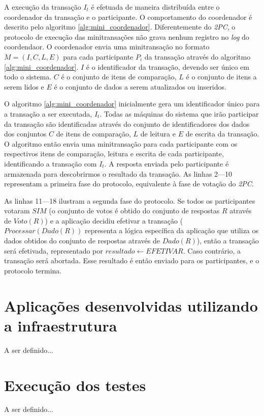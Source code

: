 \documentclass[11pt,twoside,a4paper]{book}
\begin{document}
A execução da transação \(I_t\) é efetuada de maneira distribuída entre o coordenador da transação e o participante. O comportamento do coordenador é descrito pelo algoritmo \ref{alg:mini_coordenador}. Diferentemente do \emph{2PC}, o protocolo de execução das minitransações não grava nenhum registro no \emph{log} do coordendaor. O coordenador envia uma minitransação no formato \(M = (I, C, L, E)\) para cada participante \(P_i\) da transação através do algoritmo \ref{alg:mini_coordenador}. $I$ é o identificador da transação, devendo ser único em todo o sistema. $C$ é o conjunto de itens de comparação, $L$ é o conjunto de itens a serem lidos e $E$ é o conjunto de dados a serem atualizados ou inseridos.

O algoritmo \ref{alg:mini_coordenador} inicialmente gera um identificador único para a transação a ser executada, $I_t$. Todas as máquinas do sistema que irão participar da transação são identificadas através do conjunto de identificadores dos dados dos conjuntos $C$ de itens de comparação, $L$ de leitura e $E$ de escrita da transação. O algoritmo então envia uma minitransação para cada participante com os respectivos itens de comparação, leitura e escrita de cada participante, identificando a transação com $I_t$. A resposta enviada pelo participante é armazenada para descobrirmos o resultado da transação. As linhas 2---10 representam a primeira fase do protocolo, equivalente à fase de votação do \emph{2PC}.

As linhas 11---18 ilustram a segunda fase do protocolo. Se todos os participantes votaram $SIM$ (o conjunto de votos é obtido do conjunto de respostas $R$ através de $Voto(R)$) e a aplicação decidiu efetivar a transação ($Processar(Dado(R))$ representa a lógica específica da aplicação que utiliza os dados obtidos do conjunto de respostas através de $Dado(R)$), então a transação será efetivada, representado por $resultado \gets EFETIVAR$. Caso contrário, a transação será abortada. Esse resultado é então enviado para os participantes, e o protocolo termina.

\section{Aplicações desenvolvidas utilizando a infraestrutura}
\label{sec:aplicacoes}
A ser definido...

\section{Execução dos testes}
\label{sec:testes}
A ser definido...
\end{document}
